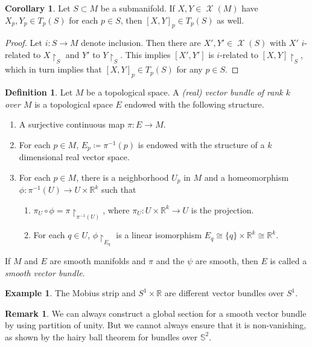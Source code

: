 \documentclass[10pt,letterpaper,cm]{nupset}
\theoremstyle{definition}
\newtheorem*{definition}{Definition}
\newtheorem{exmp}{Example}
\newtheorem{remark}{Remark}
\newtheorem{corollary}{Corollary}
\newcommand{\R}{\mathbb R}
\renewcommand{\S}{\mathbb S}
\newcommand{\1}{\mathbf{1}}
\newcommand{\0}{\vec 0}
\DeclareMathOperator{\vf}{\mathscr{X}}
\begin{document}
\begin{corollary}
Let $S \subset M$ be a submanifold. If $X, Y \in \vf(M)$ have $X_p, Y_p \in T_p(S)$ for each $p\in S$, then $[X, Y]_p \in T_p(S)$ as well.
\end{corollary}
\begin{proof}
Let $i : S \to M$ denote inclusion. Then  there are $X', Y' \in \vf(S)$ with $X'$ $i$-related to $X\restriction_S$ and $Y'$ to $Y\restriction_S$. This implies $[X', Y']$ is $i$-related to $[X, Y]\restriction_S$, which in turn implies that $[X, Y]_p \in T_p(S)$ for any $p\in S$.  
\end{proof}

\begin{definition}
Let $M$ be a topological space. A \textit{(real) vector bundle of rank $k$ over $M$} is a topological space $E$ endowed with the following structure.
\begin{enumerate}
\item A surjective continuous map $\pi : E \to M$.
\item For each $p \in M$, $E_p\coloneqq  \pi^{-1}(p)$ is endowed with the structure of a $k$ dimensional real vector space.
\item For each $p\in M$, there is a neighborhood $U_p$ in $M$ and a homeomorphism $\phi :\pi^{-1}(U) \to U \times \R^k$ such that
\begin{enumerate}
\item $\pi_U \circ \phi  = \pi \restriction_{\pi^{-1}(U)}$, where $\pi_U : U \times \R^k \to U$ is the projection.
\item For each $q\in U$, $\phi \restriction_{E_q}$ is a linear isomorphism $E_q \cong \{q\} \times \R^k \cong \R^k.$
\end{enumerate}
\end{enumerate}
If $M$ and $E$ are smooth manifolds and $\pi$ and the $\psi$ are smooth, then $E$ is called a \textit{smooth vector bundle}.
\end{definition}

\begin{exmp}
The Mobius strip and $S^1 \times \R$ are different vector bundles over $S^1$.
\end{exmp}

\begin{remark}
We can always construct a global section for a smooth vector bundle by using partition of unity. But we cannot always ensure that it is non-vanishing, as shown by the hairy ball theorem for bundles over $\S^2$.
\end{remark}
\end{document}
